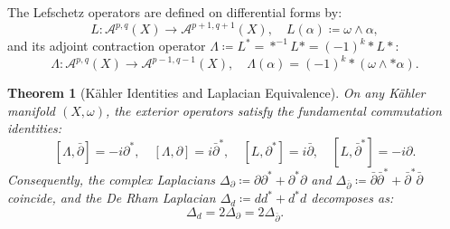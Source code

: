 \documentclass[11pt,a4paper]{article}
\theoremstyle{definition}
\theoremstyle{plain}
\newtheorem{theorem}[definition]{Theorem}
\begin{document}
The Lefschetz operators are defined on differential forms by:
\begin{equation}
    L: \mathcal{A}^{p,q}(X) \longrightarrow \mathcal{A}^{p+1,q+1}(X), \quad L(\alpha) \coloneqq \omega \wedge \alpha,
\end{equation}
and its adjoint contraction operator $\Lambda \coloneqq L^* = *^{-1} L * = (-1)^k * L *$:
\begin{equation}
    \Lambda: \mathcal{A}^{p,q}(X) \longrightarrow \mathcal{A}^{p-1,q-1}(X), \quad \Lambda(\alpha) = (-1)^k * (\omega \wedge * \alpha).
\end{equation}

\begin{theorem}[Kähler Identities and Laplacian Equivalence]
\label{thm:kahler_identities}
On any Kähler manifold $(X, \omega)$, the exterior operators satisfy the fundamental commutation identities:
\begin{equation}
    \label{eq:kahler_commutation}
    [\Lambda, \bar{\partial}] = -i \partial^*, \quad [\Lambda, \partial] = i \bar{\partial}^*, \quad [L, \partial^*] = i \bar{\partial}, \quad [L, \bar{\partial}^*] = -i \partial.
\end{equation}
Consequently, the complex Laplacians $\Delta_\partial \coloneqq \partial \partial^* + \partial^* \partial$ and $\Delta_{\bar{\partial}} \coloneqq \bar{\partial} \bar{\partial}^* + \bar{\partial}^* \bar{\partial}$ coincide, and the De Rham Laplacian $\Delta_d \coloneqq d d^* + d^* d$ decomposes as:
\begin{equation}
    \label{eq:laplacian_identity}
    \Delta_d = 2 \Delta_{\partial} = 2 \Delta_{\bar{\partial}}.
\end{equation}
\end{theorem}
\end{document}
